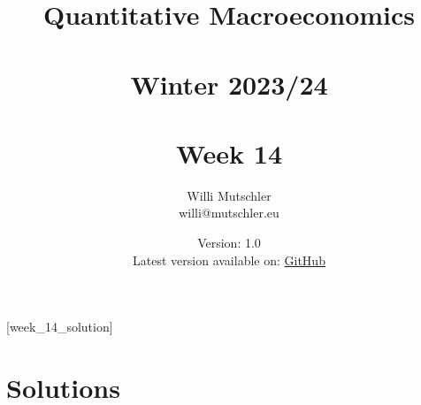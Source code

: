 
\newif\ifDisplaySolutions\DisplaySolutionstrue


\title{Quantitative Macroeconomics\\~\\Winter 2023/24\\~\\Week 14}
\author{Willi Mutschler\\willi@mutschler.eu}
\date{Version: 1.0\\Latest version available on: \href{https://github.com/wmutschl/Quantitative-Macroeconomics/releases/latest/download/week_14.pdf}{GitHub}}
\maketitle\thispagestyle{empty}

\newpage
{}[week_14_solution]
\tableofcontents\thispagestyle{empty}\newpage

\setcounter{page}{1}
\newpage
\printbibliography

\ifDisplaySolutions
\newpage
\appendix

\section{Solutions}

\fi
